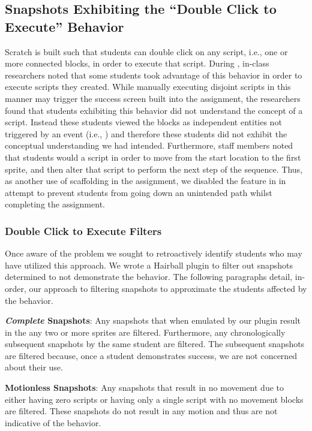 \subsection{Snapshots Exhibiting the ``Double Click to Execute'' Behavior}
Scratch is built such that students can double click on any script, i.e., one
or more connected blocks, in order to execute that script. During \sone{},
in-class researchers noted that some students took advantage of this behavior
in order to execute scripts they created. While manually executing disjoint
scripts in this manner may trigger the success screen built into the
assignment, the researchers found that students exhibiting this behavior did
not understand the concept of a script. Instead these students viewed the
blocks as independent entities not triggered by an event (i.e., \netclicked)
and therefore these students did not exhibit the conceptual understanding we
had intended. Furthermore, staff members noted that students would \dce{} a
script in order to move from the start location to the first sprite, and then
alter that script to perform the next step of the sequence. Thus, as another
use of scaffolding in the assignment, we disabled the \dce{} feature in \stwo{}
in attempt to prevent students from going down an unintended path whilst
completing the assignment.

\subsubsection{Double Click to Execute Filters}
Once aware of the problem we sought to retroactively identify students who may
have utilized this \dce{} approach. We wrote a Hairball plugin to filter out
snapshots determined to not demonstrate the \dce{} behavior. The following
paragraphs detail, in-order, our approach to filtering snapshots to approximate
the students affected by the \dce{} behavior.

\textbf{\emph{Complete} Snapshots}: Any snapshots that when emulated by our
plugin result in the \net{}  any two or more sprites are
filtered. Furthermore, any chronologically subsequent snapshots by the same
student are filtered. The subsequent snapshots are filtered because, once a
student demonstrates success, we are not concerned about their \dce{} use.

\textbf{Motionless Snapshots}: Any snapshots that result in no movement due to
either having zero scripts or having only a single \netclicked{} script with no
movement blocks are filtered. These snapshots do not result in any motion and
thus are not indicative of the \dce{} behavior.

